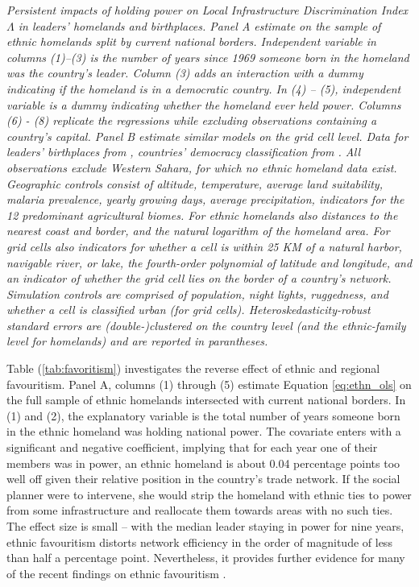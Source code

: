 \documentclass[11pt, oneside]{article}   	%
\let\oldref\ref
\renewcommand{\ref}[1]{(\oldref{#1})}
\newcommand{\mysubcaption}[1]{
\justify
\begin{spacing}{0.7}
\textit{\footnotesize #1}
\end{spacing}}
\begin{document}
\begin{table}[!t]
\mysubcaption{Persistent impacts of holding power on Local Infrastructure Discrimination Index $\Lambda$ in leaders' homelands and birthplaces. Panel A estimate on the sample of ethnic homelands split by current national borders. Independent variable in columns (1)--(3) is the number of years since 1969 someone born in the homeland was the country's leader. Column (3) adds an interaction with a dummy indicating if the homeland is in a democratic country. In (4) -- (5), independent variable is a dummy indicating whether the homeland ever held power. Columns (6) - (8) replicate the regressions while excluding observations containing a country's capital. Panel B estimate similar models on the grid cell level. Data for leaders' birthplaces from \cite{Dreher_AiddemandAfrican_2016}, countries' democracy classification from \cite{Marshall_PolityProjectCenter_2015}. All observations exclude Western Sahara, for which no ethnic homeland data exist. Geographic controls consist of altitude, temperature, average land suitability, malaria prevalence, yearly growing days, average precipitation, indicators for the 12 predominant agricultural biomes. For ethnic homelands also distances to the nearest coast and border, and the natural logarithm of the homeland area. For grid cells also indicators for whether a cell is within 25 KM of a natural harbor, navigable river, or lake, the fourth-order polynomial of latitude and longitude, and an indicator of whether the grid cell lies on the border of a country's network. Simulation controls are comprised of population, night lights, ruggedness, and whether a cell is classified urban (for grid cells). Heteroskedasticity-robust standard errors are (double-)clustered on the country level (and the ethnic-family level for homelands) and are reported in parantheses.}
\end{table}

Table \ref{tab:favoritism} investigates the reverse effect of ethnic and regional favouritism. Panel A, columns (1) through (5) estimate Equation \eqref{eq:ethn_ols} on the full sample of ethnic homelands intersected with current national borders. In (1) and (2), the explanatory variable is the total number of years someone born in the ethnic homeland was holding national power. The covariate enters with a significant and negative coefficient, implying that for each year one of their members was in power, an ethnic homeland is about 0.04 percentage points too well off given their relative position in the country's trade network. If the social planner were to intervene, she would strip the homeland with ethnic ties to power from some infrastructure and reallocate them towards areas with no such ties. The effect size is small -- with the median leader staying in power for nine years, ethnic favouritism distorts network efficiency in the order of magnitude of less than half a percentage point. Nevertheless, it provides further evidence for many of the recent findings on ethnic favouritism \citep{DeLuca_Ethnicfavoritismaxiom_2018}.
\end{document}

